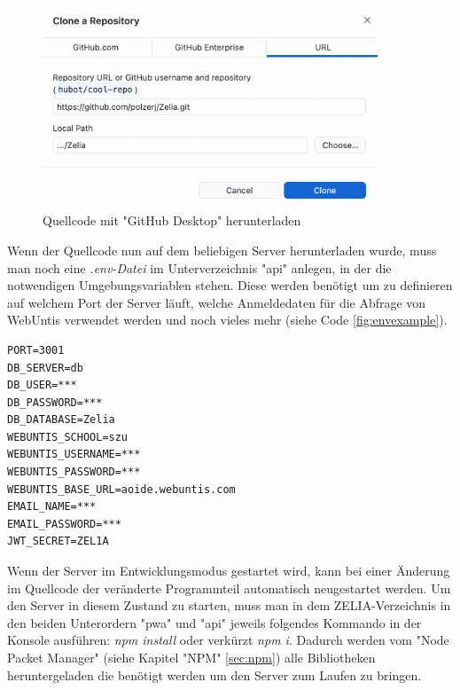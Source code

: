 \begin{figure}[H]
    \centering
    \includegraphics[width=100mm]{media/Handbuch/clone_gh.png}
    \caption{Quellcode mit "GitHub Desktop" herunterladen}
    \label{fig:clonewithdesktop}
\end{figure}


Wenn der Quellcode nun auf dem beliebigen Server herunterladen wurde, muss man noch eine \emph{.env-Datei} im Unterverzeichnis "api" anlegen, in der die notwendigen Umgebungsvariablen stehen. Diese werden benötigt um zu definieren auf welchem Port der Server läuft, welche Anmeldedaten für die Abfrage von WebUntis verwendet werden und noch vieles mehr (siehe Code \ref{fig:envexample}).


\begin{singlespace}
    \begin{lstlisting}[caption={Beispiel einer .env-Datei},label={fig:envexample},captionpos=b]
PORT=3001
DB_SERVER=db
DB_USER=***
DB_PASSWORD=***
DB_DATABASE=Zelia
WEBUNTIS_SCHOOL=szu
WEBUNTIS_USERNAME=***
WEBUNTIS_PASSWORD=***
WEBUNTIS_BASE_URL=aoide.webuntis.com
EMAIL_NAME=***
EMAIL_PASSWORD=***
JWT_SECRET=ZEL1A
    \end{lstlisting}
\end{singlespace}


Wenn der Server im Entwicklungsmodus gestartet wird, kann bei einer Änderung im Quellcode der veränderte Programmteil automatisch neugestartet werden. Um den Server in diesem Zustand zu starten, muss man in dem ZELIA-Verzeichnis in den beiden Unterordern "pwa" und "api" jeweils folgendes Kommando in der Konsole ausführen: \emph{npm install} oder verkürzt \emph{npm i}. Dadurch werden vom "Node Packet Manager" (siehe Kapitel "NPM" \ref{sec:npm}) alle Bibliotheken heruntergeladen die benötigt werden um den Server zum Laufen zu bringen.

